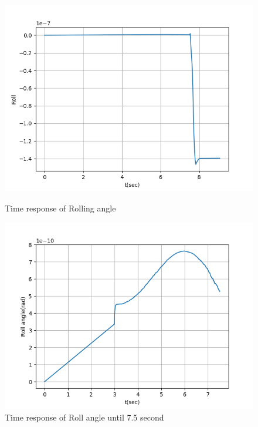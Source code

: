 \documentclass{beamer}
\begin{document}
    \begin{frame}{\secname}
        \begin{figure}
            \begin{multicols}{2}
                \includegraphics[width=\linewidth]{Figs/Roll.png}
                \caption{Time response of Rolling angle}
                \columnbreak

                \includegraphics[width=\linewidth]{Figs/Roll_part.png}
                \caption{Time response of Roll angle until 7.5 second}
            \end{multicols}
        \end{figure}
    \end{frame}
\end{document}

